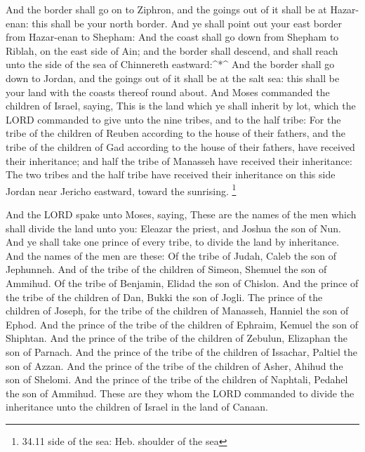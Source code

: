  And the border shall go on to Ziphron, and the goings out
of it shall be at Hazar-enan: this shall be your north border.
 And ye shall point out your east border from Hazar-enan to
Shepham:  And the coast shall go down from Shepham to
Riblah, on the east side of Ain; and the border shall descend, and shall
reach unto the side of the sea of Chinnereth eastward:\^{}*\^{}
 And the border shall go down to Jordan, and the goings out
of it shall be at the salt sea: this shall be your land with the coasts
thereof round about.  And Moses commanded the children of
Israel, saying, This is the land which ye shall inherit by lot, which
the LORD commanded to give unto the nine tribes, and to the half tribe:
 For the tribe of the children of Reuben according to the
house of their fathers, and the tribe of the children of Gad according
to the house of their fathers, have received their inheritance; and half
the tribe of Manasseh have received their inheritance:  The
two tribes and the half tribe have received their inheritance on this
side Jordan near Jericho eastward, toward the sunrising. \footnote{34.11
  side of the sea: Heb. shoulder of the sea}

 And the LORD spake unto Moses, saying,  These
are the names of the men which shall divide the land unto you: Eleazar
the priest, and Joshua the son of Nun.  And ye shall take
one prince of every tribe, to divide the land by inheritance.
 And the names of the men are these: Of the tribe of Judah,
Caleb the son of Jephunneh.  And of the tribe of the
children of Simeon, Shemuel the son of Ammihud.  Of the
tribe of Benjamin, Elidad the son of Chislon.  And the
prince of the tribe of the children of Dan, Bukki the son of Jogli.
 The prince of the children of Joseph, for the tribe of the
children of Manasseh, Hanniel the son of Ephod.  And the
prince of the tribe of the children of Ephraim, Kemuel the son of
Shiphtan.  And the prince of the tribe of the children of
Zebulun, Elizaphan the son of Parnach.  And the prince of
the tribe of the children of Issachar, Paltiel the son of Azzan.
 And the prince of the tribe of the children of Asher,
Ahihud the son of Shelomi.  And the prince of the tribe of
the children of Naphtali, Pedahel the son of Ammihud. 
These are they whom the LORD commanded to divide the inheritance unto
the children of Israel in the land of Canaan.

